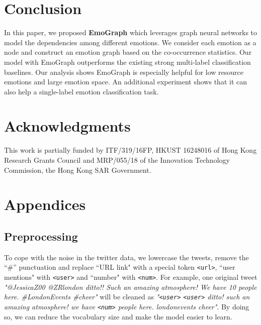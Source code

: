 \documentclass[11pt,a4paper]{article}
\begin{document}
\section{Conclusion}
In this paper, we proposed \textbf{EmoGraph} which leverages graph neural networks to model the dependencies among different emotions. We consider each emotion as a node and construct an emotion graph based on the co-occurrence statistics.
Our model with EmoGraph outperforms the existing strong multi-label classification baselines. Our analysis shows EmoGraph is especially helpful for low resource emotions and large emotion space. An additional experiment shows that it can also help a single-label emotion classification task.

\section*{Acknowledgments}
This work is partially funded by ITF/319/16FP, HKUST 16248016 of Hong
Kong Research Grants Council and MRP/055/18 of the Innovation Technology Commission, the Hong Kong SAR Government.
 





\clearpage

\appendix

\section{Appendices}
\label{sec:appendix}
\subsection{Preprocessing}

To cope with the noise in the twitter data, we lowercase the tweets, remove the ``\#'' punctuation and replace  ``URL link" with a special token \texttt{<url>}, ``user mentions" with \texttt{<user>} and ``number" with \texttt{<num>}. For example, one original tweet \textit{"@JessicaZ00 @ZRlondon ditto!! Such an amazing atmosphere! We have 10 people here. \#LondonEvents \#cheer"} will be cleaned as \textit{"\texttt{<user>} \texttt{<user>} ditto! such an amazing atmosphere! we have \texttt{<num>} people here. londonevents cheer"}. By doing so, we can reduce the vocabulary size and make the model easier to learn.

\label{sec:supplemental}
\end{document}
